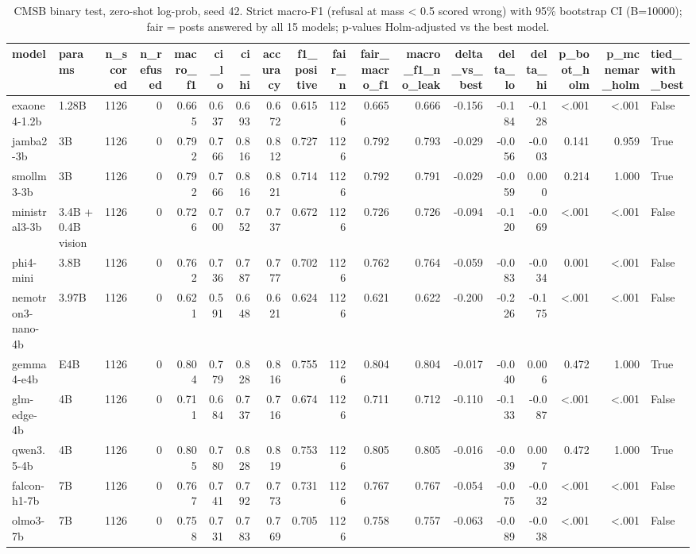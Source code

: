 \begin{table}[t]
\caption{CMSB binary test, zero-shot log-prob, seed 42. Strict macro-F1 (refusal at mass < 0.5 scored wrong) with 95\% bootstrap CI (B=10000); fair = posts answered by all 15 models; p-values Holm-adjusted vs the best model.}
\label{tab:main_cmsb_binary}
\begin{tabular}{llrrrrrrrrrrrrrrrl}
\toprule
model & params & n_scored & n_refused & macro_f1 & ci_lo & ci_hi & accuracy & f1_positive & fair_n & fair_macro_f1 & macro_f1_no_leak & delta_vs_best & delta_lo & delta_hi & p_boot_holm & p_mcnemar_holm & tied_with_best \\
\midrule
exaone4-1.2b & 1.28B & 1126 & 0 & 0.665 & 0.637 & 0.693 & 0.672 & 0.615 & 1126 & 0.665 & 0.666 & -0.156 & -0.184 & -0.128 & <.001 & <.001 & False \\
jamba2-3b & 3B & 1126 & 0 & 0.792 & 0.766 & 0.816 & 0.812 & 0.727 & 1126 & 0.792 & 0.793 & -0.029 & -0.056 & -0.003 & 0.141 & 0.959 & True \\
smollm3-3b & 3B & 1126 & 0 & 0.792 & 0.766 & 0.816 & 0.821 & 0.714 & 1126 & 0.792 & 0.791 & -0.029 & -0.059 & 0.000 & 0.214 & 1.000 & True \\
ministral3-3b & 3.4B + 0.4B vision & 1126 & 0 & 0.726 & 0.700 & 0.752 & 0.737 & 0.672 & 1126 & 0.726 & 0.726 & -0.094 & -0.120 & -0.069 & <.001 & <.001 & False \\
phi4-mini & 3.8B & 1126 & 0 & 0.762 & 0.736 & 0.787 & 0.777 & 0.702 & 1126 & 0.762 & 0.764 & -0.059 & -0.083 & -0.034 & 0.001 & <.001 & False \\
nemotron3-nano-4b & 3.97B & 1126 & 0 & 0.621 & 0.591 & 0.648 & 0.621 & 0.624 & 1126 & 0.621 & 0.622 & -0.200 & -0.226 & -0.175 & <.001 & <.001 & False \\
gemma4-e4b & E4B & 1126 & 0 & 0.804 & 0.779 & 0.828 & 0.816 & 0.755 & 1126 & 0.804 & 0.804 & -0.017 & -0.040 & 0.006 & 0.472 & 1.000 & True \\
glm-edge-4b & 4B & 1126 & 0 & 0.711 & 0.684 & 0.737 & 0.716 & 0.674 & 1126 & 0.711 & 0.712 & -0.110 & -0.133 & -0.087 & <.001 & <.001 & False \\
qwen3.5-4b & 4B & 1126 & 0 & 0.805 & 0.780 & 0.828 & 0.819 & 0.753 & 1126 & 0.805 & 0.805 & -0.016 & -0.039 & 0.007 & 0.472 & 1.000 & True \\
falcon-h1-7b & 7B & 1126 & 0 & 0.767 & 0.741 & 0.792 & 0.773 & 0.731 & 1126 & 0.767 & 0.767 & -0.054 & -0.075 & -0.032 & <.001 & <.001 & False \\
olmo3-7b & 7B & 1126 & 0 & 0.758 & 0.731 & 0.783 & 0.769 & 0.705 & 1126 & 0.758 & 0.757 & -0.063 & -0.089 & -0.038 & <.001 & <.001 & False \\

\end{tabular}
\end{table}
